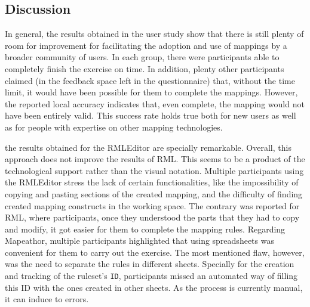 








\subsection{Discussion}
\label{sec:chp5_mapeathor_discussion}

In general, the results obtained in the user study show that there is still plenty of room for improvement for facilitating the adoption and use of mappings by a broader community of users. In each group, there were participants able to completely finish the exercise on time. In addition, plenty other participants claimed (in the feedback space left in the questionnaire) that, without the time limit, it would have been possible for them to complete the mappings. However, the reported local accuracy indicates that, even complete, the mapping would not have been entirely valid. This success rate holds true both for new users as well as for people with expertise on other mapping technologies. 

the results obtained for the RMLEditor are specially remarkable. Overall, this approach does not improve the results of RML. This seems to be a product of the technological support rather than the visual notation. Multiple participants using the RMLEditor stress the lack of certain functionalities, like the impossibility of copying and pasting sections of the created mapping, and the difficulty of finding created mapping constructs in the working space. The contrary was reported for RML, where participants, once they understood the parts that they had to copy and modify, it got easier for them to complete the mapping rules. Regarding Mapeathor, multiple participants highlighted that using spreadsheets was convenient for them to carry out the exercise. The most mentioned flaw, however, was the need to separate the rules in different sheets. Specially for the creation and tracking of the ruleset's \texttt{ID}, participants missed an automated way of filling this ID with the ones created in other sheets. As the process is currently manual, it can induce to errors.

